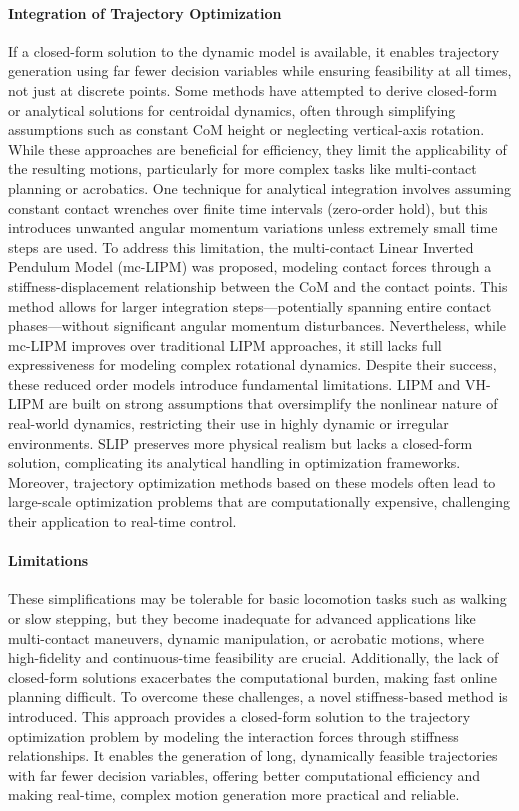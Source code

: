 \documentclass[main.tex]{subfiles}
\begin{document}
\paragraph{Integration of Trajectory Optimization} If a closed-form solution to the dynamic model is available, it enables trajectory generation using far fewer decision variables while ensuring feasibility at all times, not just at discrete points. Some methods have attempted to derive closed-form or analytical solutions for centroidal dynamics, often through simplifying assumptions such as constant CoM height or neglecting vertical-axis rotation. While these approaches are beneficial for efficiency, they limit the applicability of the resulting motions, particularly for more complex tasks like multi-contact planning or acrobatics. One technique for analytical integration involves assuming constant contact wrenches over finite time intervals (zero-order hold), but this introduces unwanted angular momentum variations unless extremely small time steps are used. To address this limitation, the multi-contact Linear Inverted Pendulum Model (mc-LIPM) was proposed, modeling contact forces through a stiffness-displacement relationship between the CoM and the contact points. This method allows for larger integration steps—potentially spanning entire contact phases—without significant angular momentum disturbances. Nevertheless, while mc-LIPM improves over traditional LIPM approaches, it still lacks full expressiveness for modeling complex rotational dynamics. Despite their success, these reduced order models introduce fundamental limitations. LIPM and VH-LIPM are built on strong assumptions that oversimplify the nonlinear nature of real-world dynamics, restricting their use in highly dynamic or irregular environments. SLIP preserves more physical realism but lacks a closed-form solution, complicating its analytical handling in optimization frameworks. Moreover, trajectory optimization methods based on these models often lead to large-scale optimization problems that are computationally expensive, challenging their application to real-time control.
\paragraph{Limitations} These simplifications may be tolerable for basic locomotion tasks such as walking or slow stepping, but they become inadequate for advanced applications like multi-contact maneuvers, dynamic manipulation, or acrobatic motions, where high-fidelity and continuous-time feasibility are crucial. Additionally, the lack of closed-form solutions exacerbates the computational burden, making fast online planning difficult. To overcome these challenges, a novel stiffness-based method is introduced. This approach provides a closed-form solution to the trajectory optimization problem by modeling the interaction forces through stiffness relationships. It enables the generation of long, dynamically feasible trajectories with far fewer decision variables, offering better computational efficiency and making real-time, complex motion generation more practical and reliable.
\end{document}
